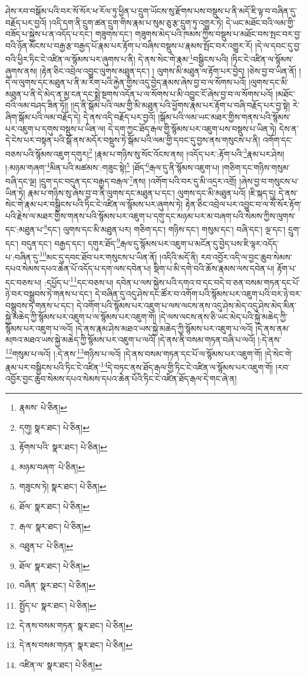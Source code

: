 ཤེས་རབ་བསྒོམ་པའི་བར་སོ་སོར་ཕ་རོལ་ཏུ་ཕྱིན་པ་དྲུག་ཡོངས་སུ་རྫོགས་པས་བསྡུས་པ་ནི་མདོ་ཇི་ལྟ་བ་བཞིན་དུ་བརྗོད་པར་བྱའོ། །འདི་དག་ནི་དྲུག་ཚན་དྲུག་གིས་རྣམ་པ་སུམ་ཅུ་རྩ་དྲུག་ཏུ་འགྱུར་ཏེ། དེ་ཡང་མཐོང་བའི་ལམ་གྱི་བཟོད་པ་སྐྱེས་པ་ན་འདོད་པ་དང་། གཟུགས་དང་། གཟུགས་མེད་པའི་ཁམས་ཀྱིས་བསྡུས་པ་མཐོང་བས་སྤང་བར་བྱ་བའི་ཉོན་མོངས་པ་བརྒྱ་རྩ་བརྒྱད་པོ་རྣམ་པར་རྟོག་པ་བཞིས་བསྡུས་པ་རྣམས་སྤོང་བར་འགྱུར་རོ། །དེ་ལ་དབང་དུ་བྱ་བའི་ཕྱིར་ཏིང་ངེ་འཛིན་ལ་སྙོམས་པར་ཞུགས་པ་ནི། དེ་ནས་སེང་གེ་རྣམ་\footnote{རྣམས་  པེ་ཅིན། }བསྒྱིངས་པའི། །ཏིང་ངེ་འཛིན་ལ་སྙོམས་ཞུགས་ནས། །རྟེན་ཅིང་འབྲེལ་འབྱུང་ལུགས་མཐུན་དང་། །
ལུགས་མི་མཐུན་ལ་རྟོག་པར་བྱེད། །ཅེས་བྱ་བ་ཡིན་ནོ། །དེ་ལ་ལུགས་དང་མཐུན་པ་ནི་མ་རིག་པའི་རྐྱེན་གྱིས་འདུ་བྱེད་རྣམས་ཞེས་བྱ་བ་ལ་སོགས་པའོ། །ལུགས་དང་མི་མཐུན་པ་ནི་དེ་མེད་ན་མྱ་ངན་དང་སྨྲེ་སྔགས་འདོན་པ་ལ་སོགས་པ་མི་འབྱུང་ངོ་ཞེས་བྱ་བ་ལ་སོགས་པའོ། །མཐོང་བའི་ལམ་བཤད་ཟིན་ཏོ།། །།ད་ནི་སྒོམ་པའི་ལམ་གྱི་མི་མཐུན་པའི་ཕྱོགས་རྣམ་པར་རྟོག་པ་བཞི་བརྗོད་པར་བྱ་སྟེ། རེ་ཞིག་སྒོམ་པའི་ལམ་བརྗོད་དེ། དེ་ནས་འདི་བརྗོད་པར་བྱའོ། །སྒོམ་པའི་ལམ་ཡང་མཐར་གྱིས་གནས་པའི་སྙོམས་པར་འཇུག་པ་དགུས་བསྡུས་པ་ཡིན་ལ། དེ་དག་ཀྱང་ཐོད་རྒལ་གྱི་སྙོམས་པར་འཇུག་པས་བསྡུས་པ་ཡིན་ཏེ། དེས་ན་དེ་ངེས་པར་བསྟན་པའི་སྒོ་ནས་མདོར་བསྡུས་ཏེ་སྒོམ་པའི་ལམ་གྱི་དབང་དུ་བྱས་ནས་གསུངས་པ་ནི། འགོག་དང་བཅས་པའི་སྙོམས་འཇུག་དགུར།\footnote{དགུ།  སྣར་ཐང་།  པེ་ཅིན། } །རྣམ་པ་གཉིས་སུ་སོང་འོངས་ནས། །འདོད་པར་:རྟོག་པའི་\footnote{རྟོགས་པའི་  སྣར་ཐང་།  པེ་ཅིན། }རྣམ་པར་ཤེས། །:མཉམ་གཞག་\footnote{མཉམ་བཞག་  པེ་ཅིན། }མིན་པའི་མཚམས་:གཟུང་སྟེ།\footnote{གཟུངས་ཏེ།  སྣར་ཐང་།  པེ་ཅིན། } །ཐོད་\footnote{ཐོལ་  སྣར་ཐང་།  པེ་ཅིན། }རྒལ་དུ་ནི་སྙོམས་འཇུག་པ། །གཅིག་དང་གཉིས་གསུམ་བཞི་དང་ལྔ། །དྲུག་དང་བདུན་དང་བརྒྱད་བརྒལ་\footnote{རྒལ་  སྣར་ཐང་།  པེ་ཅིན། }ནས། །འགོག་པའི་བར་དུ་མི་འདྲར་འགྲོ། །ཞེས་བྱ་བ་གསུངས་པ་ཡིན་ཏེ། རྣམ་པ་གཉིས་སུ་ཞེས་བྱ་བ་ནི་ལུགས་དང་མཐུན་པ་དང་། ལུགས་དང་མི་མཐུན་པའོ། །ཇི་སྐད་དུ། དེ་ནས་སེང་གེ་རྣམ་པར་བསྒྱིངས་པའི་ཏིང་ངེ་འཛིན་ལ་སྙོམས་པར་ཞུགས་ཏེ། རྟེན་ཅིང་འབྲེལ་པར་འབྱུང་བ་ལ་སོ་སོར་རྟོག་པའི་རྗེས་ལ་མཐར་གྱིས་གནས་པའི་སྙོམས་པར་འཇུག་པ་དགུ་དང་མཉམ་པར་མ་བཞག་པའི་སེམས་ཀྱིས་ལུགས་དང་:མཐུན་པ་\footnote{འཐུན་པ་  པེ་ཅིན། }དང་། ལུགས་དང་མི་མཐུན་པར། གཅིག་དང་། གཉིས་དང་། གསུམ་དང་། བཞི་དང་། ལྔ་དང་། དྲུག་དང་། བདུན་དང་། བརྒྱད་དང་། དགུར་ཐོད་\footnote{ཐོལ་  སྣར་ཐང་།  པེ་ཅིན། }རྒལ་དུ་སྙོམས་པར་འཇུག་པ་མངོན་དུ་བྱེད་པས་ཇི་ལྟར་འདོད་པ་:བཞིན་དུ་\footnote{བཞིན་  སྣར་ཐང་།  པེ་ཅིན། }མང་དུ་དབང་ཐོབ་པར་གསུངས་པ་ཡིན་ནོ། །འདིའི་མདོ་ནི། རབ་འབྱོར་འདི་ལ་བྱང་ཆུབ་སེམས་དཔའ་སེམས་དཔའ་ཆེན་པོ་འདོད་པ་དག་ལས་དབེན་པ། སྡིག་པ་མི་དགེ་བའི་ཆོས་རྣམས་ལས་དབེན་པ། རྟོག་པ་དང་བཅས་པ། :དཔྱོད་པ་\footnote{སྤྱོད་པ་  སྣར་ཐང་།  པེ་ཅིན། }དང་བཅས་པ། དབེན་པ་ལས་སྐྱེས་པའི་དགའ་བ་དང་བདེ་བ་ཅན་བསམ་གཏན་དང་པོ་ཉེ་བར་བསྒྲུབས་ཏེ་གནས་པ་དང་། དེ་བཞིན་དུ་འདུ་ཤེས་དང་ཚོར་བ་འགོག་པའི་སྙོམས་པར་འཇུག་པའི་བར་ཉེ་བར་བསྒྲུབས་ཏེ་གནས་པ་དང་། དེ་འགོག་པའི་སྙོམས་པར་འཇུག་པ་ལས་ལངས་ནས་འདུ་ཤེས་མེད་འདུ་ཤེས་མེད་མིན་སྐྱེ་མཆེད་ཀྱི་སྙོམས་པར་འཇུག་པ་ལ་སྙོམས་པར་འཇུག་གོ། །དེ་ལས་ལངས་ནས་ཅི་ཡང་མེད་པའི་སྐྱེ་མཆེད་ཀྱི་སྙོམས་པར་འཇུག་པ་ལའོ། །དེ་ནས་རྣམ་ཤེས་མཐའ་ཡས་སྐྱེ་མཆེད་ཀྱི་སྙོམས་པར་འཇུག་པ་ལའོ། །དེ་ནས་ནམ་མཁའ་མཐའ་ཡས་སྐྱེ་མཆེད་ཀྱི་སྙོམས་པར་འཇུག་པ་ལའོ། །དེ་ནས་ནི་བསམ་གཏན་བཞི་པ་ལའོ། །:དེ་ནས་\footnote{དེ་ནས་བསམ་གཏན་  སྣར་ཐང་།  པེ་ཅིན། }གསུམ་པ་ལའོ། །:དེ་ནས་\footnote{དེ་ནས་བསམ་གཏན་  སྣར་ཐང་།  པེ་ཅིན། }གཉིས་པ་ལའོ། །དེ་ནས་བསམ་གཏན་དང་པོ་ལ་སྙོམས་པར་འཇུག་གོ། །དེ་སེང་གེ་རྣམ་པར་བསྒྱིངས་པའི་ཏིང་ངེ་འཛིན་\footnote{འཛིན་ལ་  སྣར་ཐང་།  པེ་ཅིན། }དེ་བཏང་ནས་ཐོད་རྒལ་གྱི་ཏིང་ངེ་འཛིན་ལ་སྙོམས་པར་འཇུག་གོ། །རབ་འབྱོར་བྱང་ཆུབ་སེམས་དཔའ་སེམས་དཔའ་ཆེན་པོའི་ཏིང་ངེ་འཛིན་ཐོད་རྒལ་དེ་གང་ཞེ་ན། 